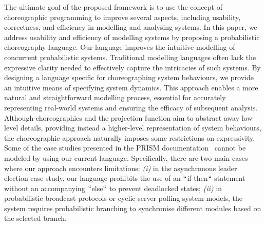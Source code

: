 The ultimate goal of the proposed framework is to use the concept of
choreographic programming to improve several aspects, including
usability, correctness, and efficiency in modelling and analysing
systems.
%
In this paper, we address usability and efficiency of modelling
systems by proposing a probabilistic choreography language.
Our language improves the intuitive modelling of concurrent
probabilistic systems. Traditional modelling languages often lack the
expressive clarity needed to effectively capture the intricacies of
such systems. By designing a language specific for choreographing
system behaviours, we provide an intuitive means of specifying system
dynamics. This approach enables a more natural and straightforward
modelling process, essential for accurately representing real-world
systems and ensuring the efficacy of subsequent analysis.
%
Although choreographies and the projection function aim to abstract
away low-level details, providing instead a higher-level
representation of system behaviours, the choreographic approach
naturally imposes some restrictions on expressivity.    Some of the case studies presented in the
PRISM documentation~\cite{PRISMdoc} cannot be modeled by using our
current language. Specifically, there are two main cases where our
approach encounters limitations:
%
\textit{(i)} in the asynchronous leader election case study, our
language prohibits the use of an $\lq\lq$if-then$\lq\lq$ statement without an
accompanying $\lq\lq$else$\lq\lq$ to prevent deadlocked states;
%
\textit{(ii)} in probabilistic broadcast protocols or cyclic server
polling system models, the system requires probabilistic branching to
synchronise different modules based on the selected branch.
%

